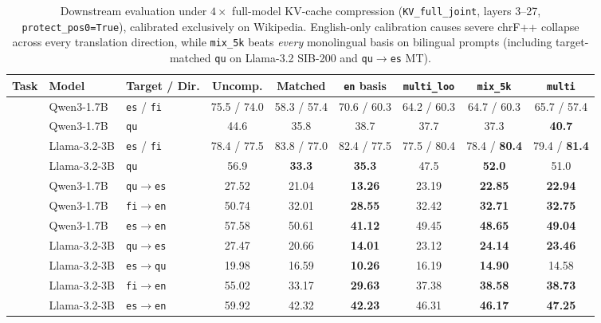\documentclass[11pt,a4paper,twocolumn]{article}
\begin{document}
\begin{table}[t]
\centering
\small
\setlength{\tabcolsep}{4.2pt}
\begin{tabular}{lllcccccc}
\toprule
Task & Model & Target / Dir. & Uncomp. & Matched & \texttt{en} basis & \texttt{multi\_loo} & \textbf{\texttt{mix\_5k}} & \texttt{multi} \\
\midrule
{}
  & Qwen3-1.7B & \texttt{es} / \texttt{fi} & 75.5 / 74.0 & 58.3 / 57.4 & 70.6 / 60.3 & 64.2 / 60.3 & 64.7 / 60.3 & 65.7 / 57.4 \\
  & Qwen3-1.7B & \texttt{qu} & 44.6 & 35.8 & 38.7 & 37.7 & 37.3 & \textbf{40.7} \\
  & Llama-3.2-3B & \texttt{es} / \texttt{fi} & 78.4 / 77.5 & 83.8 / 77.0 & 82.4 / 77.5 & 77.5 / 80.4 & 78.4 / \textbf{80.4} & 79.4 / \textbf{81.4} \\
  & Llama-3.2-3B & \texttt{qu} & 56.9 & \textbf{33.3} & \textbf{35.3} & 47.5 & \textbf{52.0} & 51.0 \\
\midrule
{}
  & Qwen3-1.7B & \texttt{qu$\rightarrow$es} & 27.52 & 21.04 & \textbf{13.26} & 23.19 & \textbf{22.85} & \textbf{22.94} \\
  & Qwen3-1.7B & \texttt{fi$\rightarrow$en} & 50.74 & 32.01 & \textbf{28.55} & 32.42 & \textbf{32.71} & \textbf{32.75} \\
  & Qwen3-1.7B & \texttt{es$\rightarrow$en} & 57.58 & 50.61 & \textbf{41.12} & 49.45 & \textbf{48.65} & \textbf{49.04} \\
  & Llama-3.2-3B & \texttt{qu$\rightarrow$es} & 27.47 & 20.66 & \textbf{14.01} & 23.12 & \textbf{24.14} & \textbf{23.46} \\
  & Llama-3.2-3B & \texttt{es$\rightarrow$qu} & 19.98 & 16.59 & \textbf{10.26} & 16.19 & \textbf{14.90} & 14.58 \\
  & Llama-3.2-3B & \texttt{fi$\rightarrow$en} & 55.02 & 33.17 & \textbf{29.63} & 37.38 & \textbf{38.58} & \textbf{38.73} \\
  & Llama-3.2-3B & \texttt{es$\rightarrow$en} & 59.92 & 42.32 & \textbf{42.23} & 46.31 & \textbf{46.17} & \textbf{47.25} \\
\bottomrule
\end{tabular}
\caption{Downstream evaluation under $4\times$ full-model KV-cache compression (\texttt{KV\_full\_joint}, layers 3--27, \texttt{protect\_pos0=True}), calibrated exclusively on Wikipedia. English-only calibration causes severe chrF++ collapse across every translation direction, while \texttt{mix\_5k} beats \emph{every} monolingual basis on bilingual prompts (including target-matched \texttt{qu} on Llama-3.2 SIB-200 and \texttt{qu$\rightarrow$es} MT).}
\label{tab:downstream}
\end{table}
\end{document}
